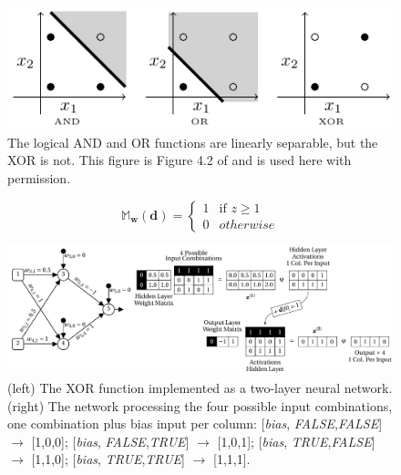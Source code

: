 \documentclass[xcolor={table}]{beamer}
\newcommand{\featN}[1]{\textsc{#1}}
\newcommand{\featL}[1]{\textit{#1}}
\begin{document}
 \begin{frame} 
\begin{figure}[t]
\centerline{
\includegraphics[width=\textwidth]{./images/fmlpda_8_08.pdf}
}
\caption[The logical \featN{AND} and \featN{OR} functions are linearly separable, but the \featN{XOR} is not.]{The logical \featN{AND} and \featN{OR} functions are linearly separable, but the \featN{XOR} is not. This figure is Figure 4.2 of \citep{kelleher:2019} and is used here with permission.}
\label{fig:linearlyseparable}
\end{figure}
\end{frame} 



 \begin{frame} 
	\begin{equation}
\mathbb{M}_{\mathbf{w}}(\mathbf{d}) = 	\begin{cases}
		1 & \text{if } z \geq 1\\
		0 & otherwise
	\end{cases}
	\label{eqn:XORNetworkThreshold}
\end{equation}
\end{frame} 

 \begin{frame} 
\begin{figure}[t]
\centerline{
\includegraphics[width=\textwidth]{./images/fmlpda_8_09.pdf}
}
\caption[(left) The XOR function implemented as a two-layer neural network. (right) The network processing the four possible input combinations.]{(left) The XOR function implemented as a two-layer neural network. (right) The network processing the four possible input combinations, one combination plus bias input per column: [\featL{bias}, \featL{FALSE},\featL{FALSE}] $\rightarrow$  [1,0,0]; [\featL{bias}, \featL{FALSE},\featL{TRUE}] $\rightarrow$  [1,0,1]; [\featL{bias}, \featL{TRUE},\featL{FALSE}] $\rightarrow$  [1,1,0]; [\featL{bias}, \featL{TRUE},\featL{TRUE}] $\rightarrow$  [1,1,1].}
\label{fig:XORNetworkBatch}
\end{figure}
\end{frame} 
\end{document}
